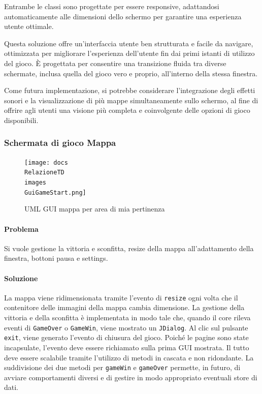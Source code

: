\documentclass[a4paper,12pt]{report}
\begin{document}
Entrambe le classi sono progettate per essere responsive, adattandosi automaticamente alle dimensioni dello schermo per garantire una esperienza utente ottimale.

Questa soluzione offre un'interfaccia utente ben strutturata e facile da navigare, ottimizzata per migliorare l'esperienza dell'utente fin dai primi istanti di utilizzo del gioco. È progettata per consentire una transizione fluida tra diverse schermate, inclusa quella del gioco vero e proprio, all'interno della stessa finestra.

Come futura implementazione, si potrebbe considerare l'integrazione degli effetti sonori e la visualizzazione di più mappe simultaneamente sullo schermo, al fine di offrire agli utenti una visione più completa e coinvolgente delle opzioni di gioco disponibili.

\subsubsection{Schermata di gioco Mappa}
\begin{figure}[H]
	\centering{}
	\texttt{[image: docs\\RelazioneTD\\images\\GuiGameStart.png]}
	\caption{UML GUI mappa per area di mia pertinenza}
	\label{img:GuiGameStart-Aurora}
\end{figure}
\paragraph{Problema} Si vuole gestione la vittoria e sconfitta, resize della mappa all'adattamento della finestra, bottoni pausa e settings.
\paragraph{Soluzione} La mappa viene ridimensionata tramite l'evento di \texttt{resize} ogni volta che il contenitore delle immagini della mappa cambia dimensione. La gestione della vittoria e della sconfitta è implementata in modo tale che, quando il core rileva eventi di \texttt{GameOver} o \texttt{GameWin}, viene mostrato un \texttt{JDialog}. Al clic sul pulsante \texttt{exit}, viene generato l'evento di chiusura del gioco. Poiché le pagine sono state incapsulate, l'evento deve essere richiamato sulla prima GUI mostrata. Il tutto deve essere scalabile tramite l'utilizzo di metodi in cascata e non ridondante. La suddivisione dei due metodi per \texttt{gameWin} e \texttt{gameOver} permette, in futuro, di avviare comportamenti diversi e di gestire in modo appropriato eventuali store di dati.
\end{document}
